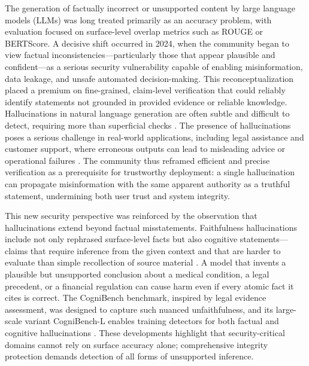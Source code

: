 \documentclass[11pt,a4paper]{article}
\begin{document}
The generation of factually incorrect or unsupported content by large language models (LLMs) was long treated primarily as an accuracy problem, with evaluation focused on surface-level overlap metrics such as ROUGE or BERTScore. A decisive shift occurred in 2024, when the community began to view factual inconsistencies---particularly those that appear plausible and confident---as a serious security vulnerability capable of enabling misinformation, data leakage, and unsafe automated decision-making. This reconceptualization placed a premium on fine-grained, claim-level verification that could reliably identify statements not grounded in provided evidence or reliable knowledge. Hallucinations in natural language generation are often subtle and difficult to detect, requiring more than superficial checks \cite{Anaokar_2025_Halludetect_9248653c}. The presence of hallucinations poses a serious challenge in real-world applications, including legal assistance and customer support, where erroneous outputs can lead to misleading advice or operational failures \cite{Anaokar_2025_Halludetect_9248653c}. The community thus reframed efficient and precise verification as a prerequisite for trustworthy deployment: a single hallucination can propagate misinformation with the same apparent authority as a truthful statement, undermining both user trust and system integrity.

This new security perspective was reinforced by the observation that hallucinations extend beyond factual misstatements. Faithfulness hallucinations include not only rephrased surface-level facts but also cognitive statements---claims that require inference from the given context and that are harder to evaluate than simple recollection of source material \cite{Tang_2025_Cognibench_0b308648}. A model that invents a plausible but unsupported conclusion about a medical condition, a legal precedent, or a financial regulation can cause harm even if every atomic fact it cites is correct. The CogniBench benchmark, inspired by legal evidence assessment, was designed to capture such nuanced unfaithfulness, and its large-scale variant CogniBench-L enables training detectors for both factual and cognitive hallucinations \cite{Tang_2025_Cognibench_0b308648}. These developments highlight that security-critical domains cannot rely on surface accuracy alone; comprehensive integrity protection demands detection of all forms of unsupported inference.
\end{document}
